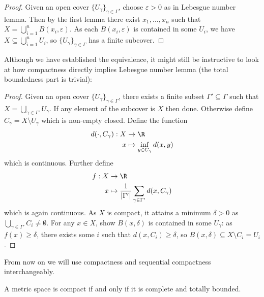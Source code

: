 \documentclass[a4paper]{article}
\begin{document}
\begin{proof}
  Given an open cover \(\{U_\gamma\}_{\gamma \in \Gamma}\), choose \(\varepsilon > 0\) as in Lebesgue number lemma. Then by the first lemma there exist \(x_1, \dots, x_n\) such that \(X = \bigcup_{i = 1}^n B(x_i, \varepsilon)\). As each \(B(x_i, \varepsilon)\) is contained in some \(U_i\), we have \(X \subseteq \bigcup_{i = 1}^n U_i\), so \(\{U_\gamma\}_{\gamma \in \Gamma}\) has a finite subcover.
\end{proof}

Although we have established the equivalence, it might still be instructive to look at how compactness directly implies Lebesgue number lemma (the total boundedness part is trivial):

\begin{proof}
  Given an open cover \(\{U_\gamma\}_{\gamma \in \Gamma}\), there exists a finite subset \(\Gamma' \subseteq \Gamma\) such that \(X = \bigcup_{\gamma \in \Gamma'} U_\gamma\). If any element of the subcover is \(X\) then done. Otherwise define \(C_\gamma = X \setminus U_\gamma\) which is non-empty closed. Define the function
  \begin{align*}
    d(\cdot, C_\gamma): X &\to \R \\
    x &\mapsto \inf_{y \in C_\gamma} d(x, y)
  \end{align*}
  which is continuous. Further define
  \begin{align*}
    f: X &\to \R \\
    x &\mapsto \frac{1}{|\Gamma'|} \sum_{\gamma \in \Gamma'} d(x, C_\gamma)
  \end{align*}
  which is again continuous. As \(X\) is compact, it attains a minimum \(\delta > 0\) as \(\bigcup_{\gamma \in \Gamma'} C_i \neq \emptyset\). For any \(x \in X\), show \(B(x, \delta)\) is contained in some \(U_\gamma\): as \(f(x) \geq \delta\), there exists some \(i\) such that \(d(x, C_i) \geq \delta\), so \(B(x, \delta) \subseteq X \setminus C_i = U_i\).
\end{proof}

From now on we will use compactness and sequential compactness interchangeably.

\begin{proposition}
  A metric space is compact if and only if it is complete and totally bounded.
\end{proposition}
\end{document}
